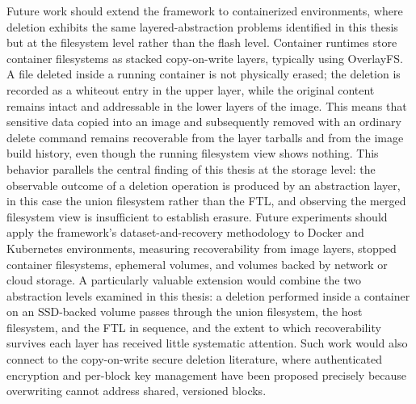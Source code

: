 Future work should extend the framework to containerized environments, where deletion exhibits the same layered-abstraction problems identified in this thesis but at the 
filesystem level rather than the flash level. Container runtimes store container filesystems as stacked copy-on-write layers, typically using OverlayFS. A file deleted 
inside a running container is not physically erased; the deletion is recorded as a whiteout entry in the upper layer, while the original content remains intact and 
addressable in the lower layers of the image. This means that sensitive data copied into an image and subsequently removed with an ordinary delete command remains 
recoverable from the layer tarballs and from the image build history, even though the running filesystem view shows nothing. This behavior parallels the central finding 
of this thesis at the storage level: the observable outcome of a deletion operation is produced by an abstraction layer, in this case the union filesystem rather than 
the FTL, and observing the merged filesystem view is insufficient to establish erasure. Future experiments should apply the framework's dataset-and-recovery 
methodology to Docker and Kubernetes environments, measuring recoverability from image layers, stopped container filesystems, ephemeral volumes, and volumes backed by 
network or cloud storage. A particularly valuable extension would combine the two abstraction levels examined in this thesis: a deletion performed inside a container 
on an SSD-backed volume passes through the union filesystem, the host filesystem, and the FTL in sequence, and the extent to which recoverability survives each layer 
has received little systematic attention. Such work would also connect to the copy-on-write secure deletion literature, where authenticated encryption and per-block key 
management have been proposed precisely because overwriting cannot address shared, versioned blocks.